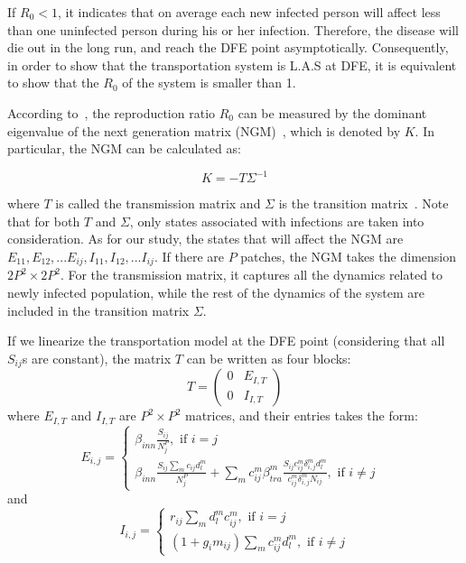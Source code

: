 \documentclass[review]{elsarticle}
\theoremstyle{plain}
\theoremstyle{definition}
\theoremstyle{remark}
\numberwithin{equation}{section}
\theoremstyle{remark}
\begin{document}
If $R_0<1$, it indicates that on average each new infected person will affect less than one uninfected person during his or her infection. Therefore, the disease will die out in the long run, and reach the DFE point asymptotically. Consequently, in order to show that the transportation system is L.A.S at DFE, it is equivalent to show that the $R_0$ of the system is smaller than 1. 

According to~\cite{diekmann2009construction,van2002reproduction}, the reproduction ratio $R_0$ can be measured by the dominant eigenvalue of the next generation matrix (NGM)~\cite{diekmann1990definition}, which is denoted by $K$. In particular, the NGM can be calculated as:

\begin{equation}
K=-T\Sigma^{-1}
\end{equation}

where $T$ is called the transmission matrix and $\Sigma$ is the transition matrix~\cite{diekmann2009construction}. Note that for both $T$ and $\Sigma$, only states associated with infections are taken into consideration. As for our study, the states that will affect the NGM are $E_{11},E_{12},...E_{ij},I_{11},I_{12},...I_{ij}$. If there are $P$ patches, the NGM takes the dimension $2P^2\times 2P^2$. For the transmission matrix, it captures all the dynamics related to newly infected population, while the rest of the dynamics of the system are included in the transition matrix $\Sigma$. 

If we linearize the transportation model at the DFE point (considering that all $S_{ij}$s are constant), the matrix $T$ can be written as four blocks:
\begin{equation}
T=
\begin{pmatrix}
0 & E_{I,T} \\
0 & I_{I,T}
\end{pmatrix}
\end{equation}
where $E_{I,T}$ and $I_{I,T}$ are $P^2\times P^2$ matrices, and their entries takes the form:
\begin{equation}
E_{i,j}=\begin{cases}
\beta_{inn}\frac{S_{ij}}{N_j^{P}}, \text{  if $i=j$}\\
\beta_{inn}\frac{S_{ij}\sum_m c_{ij}d_l^m}{N_j^P}+\sum_m c_{ij}^m\beta_{tra}^m \frac{S_{ij}c_{ij}^m\delta_{i,j}^md_l^m}{c_{ij}^m\delta_{i,j}^mN_{ij}}, \text{ if $i\neq j$ }
\end{cases}
\end{equation}
and
\begin{equation}
I_{i,j}=\begin{cases}
r_{ij}\sum_m d_l^mc_{ij}^m, \text{  if $i=j$}\\
(1+g_im_{ij})\sum_m c_{ij}^m d_l^m, \text{ if $i\neq j$}
\end{cases}
\end{equation} 
\end{document}
